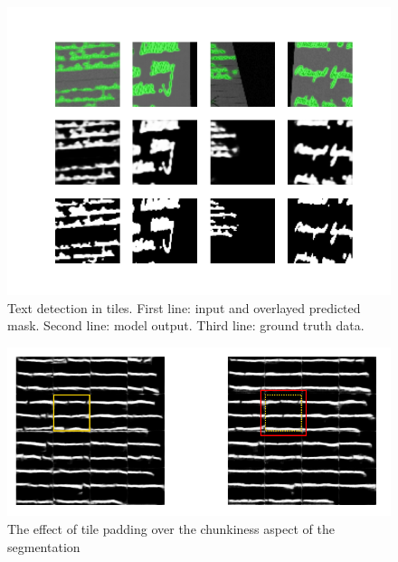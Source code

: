 \begin{figure}[htbp]
    \centering
        \includegraphics[scale=0.5]{figures/lineseg_bin_64}
    \caption{Text detection in tiles. First line: input and overlayed predicted mask. Second line: model output. Third line: ground truth data.}
    \label{FixLineSegBin}        
\end{figure}

\begin{figure}[htbp]
    \centering
        \includegraphics[scale=0.7]{figures/seg_padding.png}
    \caption{The effect of tile padding over the chunkiness aspect of the segmentation}
    \label{FigSegPadding}        
\end{figure}


